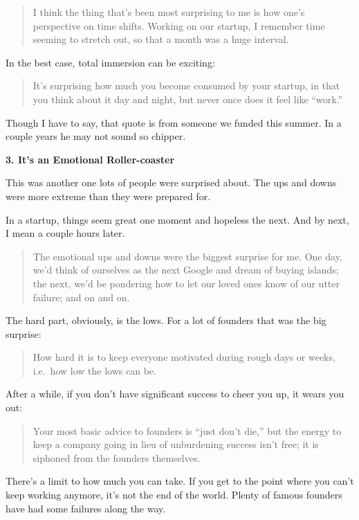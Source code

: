 \begin{quote}
I think the thing that's been most surprising to me is how one's
perspective on time shifts. Working on our startup, I remember time
seeming to stretch out, so that a month was a huge interval.
\end{quote}

In the best case, total immersion can be exciting:

\begin{quote}
It's surprising how much you become consumed by your startup, in that
you think about it day and night, but never once does it feel like
``work.''
\end{quote}

Though I have to say, that quote is from someone we funded this summer.
In a couple years he may not sound so chipper.

\textbf{3. It's an Emotional Roller-coaster}

This was another one lots of people were surprised about. The ups and
downs were more extreme than they were prepared for.

In a startup, things seem great one moment and hopeless the next. And by
next, I mean a couple hours later.

\begin{quote}
The emotional ups and downs were the biggest surprise for me. One day,
we'd think of ourselves as the next Google and dream of buying islands;
the next, we'd be pondering how to let our loved ones know of our utter
failure; and on and on.
\end{quote}

The hard part, obviously, is the lows. For a lot of founders that was
the big surprise:

\begin{quote}
How hard it is to keep everyone motivated during rough days or weeks,
i.e.~how low the lows can be.
\end{quote}

After a while, if you don't have significant success to cheer you up, it
wears you out:

\begin{quote}
Your most basic advice to founders is ``just don't die,'' but the energy
to keep a company going in lieu of unburdening success isn't free; it is
siphoned from the founders themselves.
\end{quote}

There's a limit to how much you can take. If you get to the point where
you can't keep working anymore, it's not the end of the world. Plenty of
famous founders have had some failures along the way.

